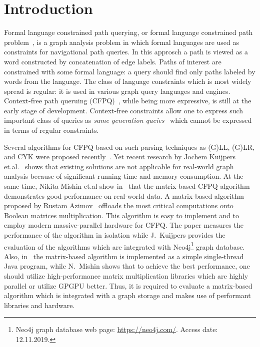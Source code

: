 \section{Introduction}

Formal language constrained path querying, or formal language constrained path problem~\cite{barrett2000formal}, is a graph analysis problem in which formal languages are used as constraints for navigational path queries.
In this approsch a path is viewed as a word constructed by concatenation of edge labels.
Paths of interest are constrained with some formal language: a query should find only paths labeled by words from the language.
The class of language constraints which is most widely spread is regular: it is used in various graph query languages and engines.
Context-free path queruing (CFPQ)~\cite{Yannakakis}, while being more expressive, is still at the early stage of development.
Context-free constraints allow one to express such important class of queries as \textit{same generation queies}~\cite{FndDB} which cannot be expressed in terms of regular constraints.

Several algorithms for CFPQ based on such parsing techniques as (G)LL, (G)LR, and CYK were proposed recently~\cite{bradford2007quickest,ward2008distributed,bradford2016fast,hellingsPathQuerying,Grigorev:2017:CPQ:3166094.3166104,Verbitskaia:2018:PCC:3241653.3241655,RDF,10.1007/978-3-319-91662-0_17,Medeiros:2018:EEC:3167132.3167265}.
Yet recent research by Jochem Kuijpers et.al.~\cite{Kuijpers:2019:ESC:3335783.3335791} shows that existing solutions are not applicable for real-world graph analysis because of significant running time and memory consumption.
At the same time, Nikita Mishin et.al show in~\cite{Mishin:2019:ECP:3327964.3328503} that the matrix-based CFPQ algorithm demonstrates good performance on real-world data.
A matrix-based algorithm proposed by Rustam Azimov~\cite{Azimov:2018:CPQ:3210259.3210264} offloads the most critical computations onto Boolean matrices multiplication.
This algorithm is easy to implement and to employ modern massive-parallel hardware for CFPQ.
The paper measures the performance of the algorithm in isolation while J.~Kuijpers provides the evaluation of the algorithms which are integrated with Neo4j\footnote{Neo4j graph database web page: \url{https://neo4j.com/}. Access date: 12.11.2019.} graph database.
Also, in~\cite{Kuijpers:2019:ESC:3335783.3335791} the matrix-based algorithm is implemented as a simple single-thread Java program, while N.~Mishin shows that to achieve the best performance, one should utilize high-performance matrix multiplication libraries which are highly parallel or utilize GPGPU better.
Thus, it is required to evaluate a matrix-based algorithm which is integrated with a graph storage and makes use of performant libraries and hardware.

